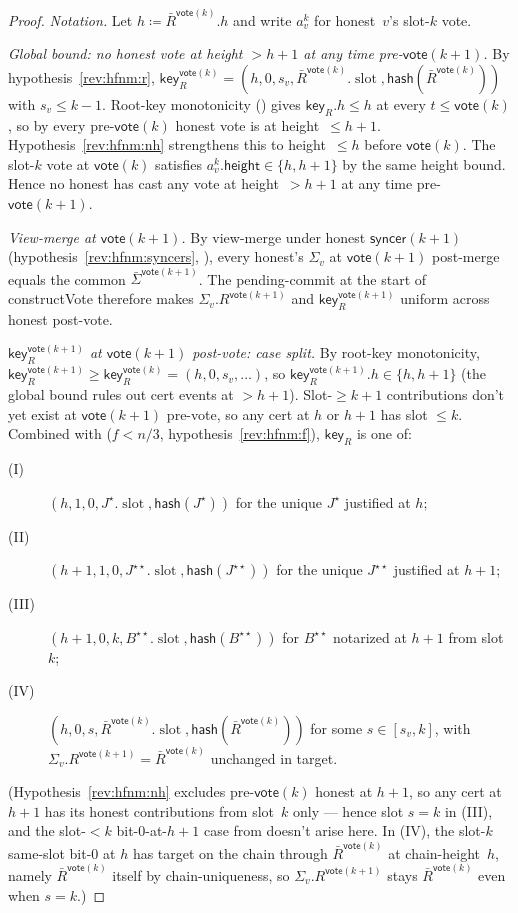 \documentclass{article}
\newcommand{\slot}[0]{\ensuremath{\operatorname{\mathrm{slot}}}}
\newcommand{\height}{\mathsf{height}}
\newcommand{\hash}{\mathsf{hash}}
\newcommand{\key}{\mathsf{key}}
\newcommand{\syncer}{\mathsf{syncer}}
\newcommand{\vote}{\mathsf{vote}}
\newcommand{\comm}[1]{\bar{#1}}
\newcommand{\constructVote}{\textsf{constructVote}\xspace}
\theoremstyle{plain}
\theoremstyle{definition}
\theoremstyle{remark}
\begin{document}
\begin{proof}
\emph{Notation.}
Let $h \coloneqq \comm{R}^{\vote(k)}.h$ and write $a^k_v$ for honest~$v$'s slot-$k$ vote.

\emph{Global bound: no honest vote at height $> h+1$ at any time pre-$\vote(k+1)$.}
By hypothesis~\ref{rev:hfnm:r}, $\key_R^{\vote(k)} = (h, 0, s_v, \comm{R}^{\vote(k)}.\slot, \hash(\comm{R}^{\vote(k)}))$ with $s_v \leq k-1$. Root-key monotonicity () gives $\key_R.h \leq h$ at every $t \leq \vote(k)$, so by  every pre-$\vote(k)$ honest vote is at height~$\leq h+1$. Hypothesis~\ref{rev:hfnm:nh} strengthens this to height~$\leq h$ before $\vote(k)$. The slot-$k$ vote at $\vote(k)$ satisfies $a^k_v.\height \in \{h, h+1\}$ by the same height bound. Hence no honest has cast any vote at height~$> h+1$ at any time pre-$\vote(k+1)$.

\emph{View-merge at $\vote(k+1)$.}
By view-merge under honest $\syncer(k+1)$ (hypothesis~\ref{rev:hfnm:syncers}, ), every honest's $\Sigma_v$ at $\vote(k+1)$ post-merge equals the common $\comm{\Sigma}^{\vote(k+1)}$. The pending-commit at the start of \constructVote{} therefore makes $\Sigma_v.R^{\vote(k+1)}$ and $\key_R^{\vote(k+1)}$ uniform across honest post-vote.

\emph{$\key_R^{\vote(k+1)}$ at $\vote(k+1)$ post-vote: case split.}
By root-key monotonicity, $\key_R^{\vote(k+1)} \geq \key_R^{\vote(k)} = (h, 0, s_v, \ldots)$, so $\key_R^{\vote(k+1)}.h \in \{h, h+1\}$ (the global bound rules out cert events at $> h+1$). Slot-$\geq k+1$ contributions don't yet exist at $\vote(k+1)$ pre-vote, so any cert at $h$ or $h+1$ has slot $\leq k$. Combined with  ($f<n/3$, hypothesis~\ref{rev:hfnm:f}), $\key_R$ is one of:
\begin{description}
  \item[(I)] $(h, 1, 0, J^\star.\slot, \hash(J^\star))$ for the unique $J^\star$ justified at $h$;
  \item[(II)] $(h+1, 1, 0, J^{\star\star}.\slot, \hash(J^{\star\star}))$ for the unique $J^{\star\star}$ justified at $h+1$;
  \item[(III)] $(h+1, 0, k, B^{\star\star}.\slot, \hash(B^{\star\star}))$ for $B^{\star\star}$ notarized at $h+1$ from slot~$k$;
  \item[(IV)] $(h, 0, s, \comm{R}^{\vote(k)}.\slot, \hash(\comm{R}^{\vote(k)}))$ for some $s \in [s_v, k]$, with $\Sigma_v.R^{\vote(k+1)} = \comm{R}^{\vote(k)}$ unchanged in target.
\end{description}
(Hypothesis~\ref{rev:hfnm:nh} excludes pre-$\vote(k)$ honest at $h+1$, so any cert at $h+1$ has its honest contributions from slot~$k$ only — hence slot $s = k$ in (III), and the slot-$<k$ bit-$0$-at-$h+1$ case from  doesn't arise here. In (IV), the slot-$k$ same-slot bit-$0$ at $h$ has target on the chain through $\comm{R}^{\vote(k)}$ at chain-height~$h$, namely $\comm{R}^{\vote(k)}$ itself by chain-uniqueness, so $\Sigma_v.R^{\vote(k+1)}$ stays $\comm{R}^{\vote(k)}$ even when $s = k$.)


\end{proof}
\end{document}
